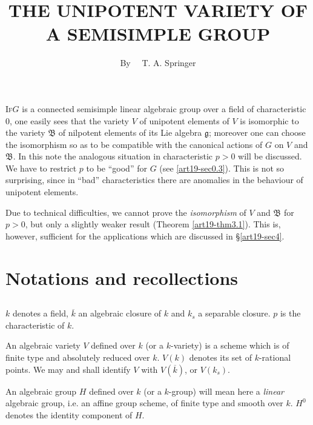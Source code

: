 \title{THE UNIPOTENT VARIETY OF A SEMISIMPLE GROUP}

\author{By~~ T. A. Springer}
\date{}

\maketitle

\setcounter{pageoriginal}{372}
\textsc{If}\pageoriginale $G$ is a connected semisimple linear algebraic group over a field of characteristic $0$, one easily sees that the variety $V$ of unipotent elements of $V$ is isomorphic to the variety $\mathfrak{B}$ of nilpotent elements of its Lie algebra $\mathfrak{g}$; moreover one can choose the isomorphism so as to be compatible with the canonical actions of $G$ on $V$ and $\mathfrak{B}$. In this note the analogous situation in characteristic $p>0$ will be discussed. We have to restrict $p$ to be ``good'' for $G$ (see \ref{art19-sec0.3}). This is not so surprising, since in ``bad'' characteristics there are anomalies in the behaviour of unipotent elements.

Due to technical difficulties, we cannot prove the {\em isomorphism} of $V$ and $\mathfrak{B}$ for $p>0$, but only a slightly weaker result (Theorem \ref{art19-thm3.1}). This is, however, sufficient for the applications which are discussed in \S\ref{art19-sec4}.

\setcounter{section}{-1}
\section{Notations and recollections}\label{art19-sec0}

\subsection{}\label{art19-sec0.1} 
$k$ denotes a field, $\overline{k}$ an algebraic closure of $k$ and $k_{s}$ a separable closure. $p$ is the characteristic of $k$.

An algebraic variety $V$ defined over $k$ (or a $k$-variety) is a scheme which is of finite type and absolutely reduced over $k$. $V(k)$ denotes its set of $k$-rational points. We may and shall identify $V$ with $V(\overline{k})$, or $V(k_{s})$.

An algebraic group $H$ defined over $k$ (or a $k$-group) will mean here a {\em linear} algebraic group, i.e. an affine group scheme, of finite type and smooth over $k$. $H^{0}$ denotes the identity component of $H$.

